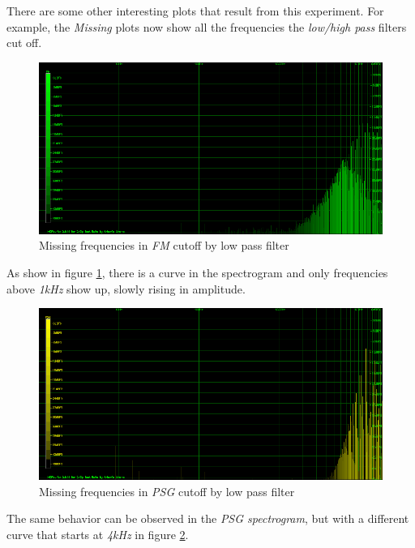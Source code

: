 \documentclass[10pt,a4paper]{report}
\begin{document}
There are some other interesting plots that result from this experiment. For example, the \textit{Missing} plots now show all the frequencies the \textit{low/high pass} filters cut off.

\begin{figure}[H]
	\centering
	\includegraphics[width=1.0\linewidth]{images/interpretation/Plot4-4-Missing-FM.png}
	\caption[Missing FM]{Missing frequencies in \textit{FM} cutoff by low pass filter}
	\label{fig:plot4-4-missing-fm}
\end{figure}

As show in figure \ref{fig:plot4-4-missing-fm}, there is a curve in the spectrogram and only frequencies above \textit{1kHz} show up, slowly rising in amplitude.

\begin{figure}[H]
	\centering
	\includegraphics[width=1.0\linewidth]{images/interpretation/Plot4-5-Missing-PSG.png}
	\caption[Missing PSG]{Missing frequencies in \textit{PSG} cutoff by low pass filter}
	\label{fig:plot4-5-missing-psg}
\end{figure}

The same behavior can be observed in the \textit{PSG spectrogram}, but with a different curve that starts at \textit{4kHz} in figure \ref{fig:plot4-5-missing-psg}.
\end{document}
